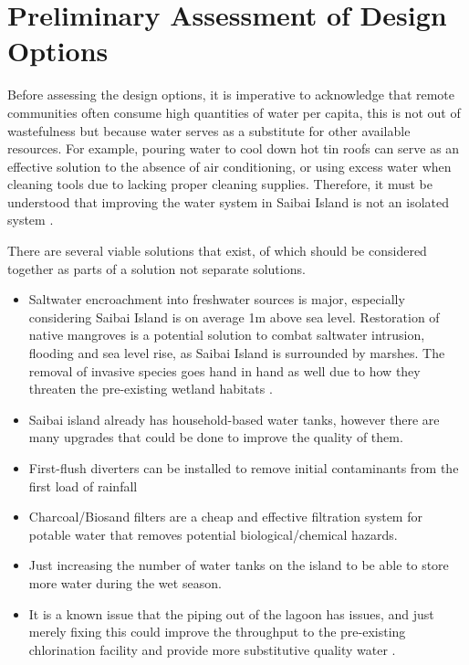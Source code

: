 \documentclass[a4paper,12pt]{report}
\begin{document}
\section{Preliminary Assessment of Design Options}

Before assessing the design options, it is imperative to acknowledge that remote communities often consume high quantities of water per capita, this is not out of wastefulness but because water serves as a substitute for other available resources. For example, pouring water to cool down hot tin roofs can serve as an effective solution to the absence of air conditioning, or using excess water when cleaning tools due to lacking proper cleaning supplies. Therefore, it must be understood that improving the water system in Saibai Island is not an isolated system \citep{remote_water_convo}.

There are several viable solutions that exist, of which should be considered together as parts of a solution not separate solutions.

\begin{itemize}
	\item Saltwater encroachment into freshwater sources is major, especially considering Saibai Island is on average 1m above sea level. Restoration of native mangroves is a potential solution to combat saltwater intrusion, flooding and sea level rise, as Saibai Island is surrounded by marshes. The removal of invasive species goes hand in hand as well due to how they threaten the pre-existing wetland habitats \citep{mangrove_research}.
  
  \item Saibai island already has household-based water tanks, however there are many upgrades that could be done to improve the quality of them.
  
  \item First-flush diverters can be installed to remove initial contaminants from the first load of rainfall
  
  \item Charcoal/Biosand filters are a cheap and effective filtration system for potable water that removes potential biological/chemical hazards.
  
  \item Just increasing the number of water tanks on the island to be able to store more water during the wet season.
  
	\item It is a known issue that the piping out of the lagoon has issues, and just merely fixing this could improve the throughput to the pre-existing chlorination facility and provide more substitutive quality water \citep{lagoon_pipe_report}.
\end{itemize}
\end{document}

